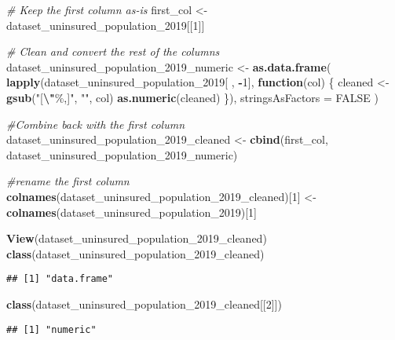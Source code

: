 \documentclass[
]{article}
\newenvironment{Shaded}{\begin{snugshade}}{\end{snugshade}}
\newcommand{\AttributeTok}[1]{\textcolor[rgb]{0.13,0.29,0.53}{#1}}
\newcommand{\CommentTok}[1]{\textcolor[rgb]{0.56,0.35,0.01}{\textit{#1}}}
\newcommand{\ConstantTok}[1]{\textcolor[rgb]{0.56,0.35,0.01}{#1}}
\newcommand{\ControlFlowTok}[1]{\textcolor[rgb]{0.13,0.29,0.53}{\textbf{#1}}}
\newcommand{\DecValTok}[1]{\textcolor[rgb]{0.00,0.00,0.81}{#1}}
\newcommand{\FunctionTok}[1]{\textcolor[rgb]{0.13,0.29,0.53}{\textbf{#1}}}
\newcommand{\NormalTok}[1]{#1}
\newcommand{\OtherTok}[1]{\textcolor[rgb]{0.56,0.35,0.01}{#1}}
\newcommand{\SpecialCharTok}[1]{\textcolor[rgb]{0.81,0.36,0.00}{\textbf{#1}}}
\newcommand{\StringTok}[1]{\textcolor[rgb]{0.31,0.60,0.02}{#1}}
\begin{document}
\begin{Shaded}
\begin{Highlighting}[]
\CommentTok{\# Keep the first column as{-}is}
\NormalTok{first\_col }\OtherTok{\textless{}{-}}\NormalTok{ dataset\_uninsured\_population\_2019[[}\DecValTok{1}\NormalTok{]]}

\CommentTok{\# Clean and convert the rest of the columns}
\NormalTok{dataset\_uninsured\_population\_2019\_numeric }\OtherTok{\textless{}{-}} \FunctionTok{as.data.frame}\NormalTok{(}
  \FunctionTok{lapply}\NormalTok{(dataset\_uninsured\_population\_2019[ , }\SpecialCharTok{{-}}\DecValTok{1}\NormalTok{], }\ControlFlowTok{function}\NormalTok{(col) \{}
\NormalTok{    cleaned }\OtherTok{\textless{}{-}} \FunctionTok{gsub}\NormalTok{(}\StringTok{"[}\SpecialCharTok{\textbackslash{}"}\StringTok{\%,]"}\NormalTok{, }\StringTok{""}\NormalTok{, col)}
    \FunctionTok{as.numeric}\NormalTok{(cleaned)}
\NormalTok{  \}),}
  \AttributeTok{stringsAsFactors =} \ConstantTok{FALSE}
\NormalTok{)}

\CommentTok{\#Combine back with the first column}
\NormalTok{dataset\_uninsured\_population\_2019\_cleaned }\OtherTok{\textless{}{-}} \FunctionTok{cbind}\NormalTok{(first\_col, dataset\_uninsured\_population\_2019\_numeric)}

\CommentTok{\#rename the first column}
\FunctionTok{colnames}\NormalTok{(dataset\_uninsured\_population\_2019\_cleaned)[}\DecValTok{1}\NormalTok{] }\OtherTok{\textless{}{-}} \FunctionTok{colnames}\NormalTok{(dataset\_uninsured\_population\_2019)[}\DecValTok{1}\NormalTok{]}

\FunctionTok{View}\NormalTok{(dataset\_uninsured\_population\_2019\_cleaned)}
\FunctionTok{class}\NormalTok{(dataset\_uninsured\_population\_2019\_cleaned)}
\end{Highlighting}
\end{Shaded}

\begin{verbatim}
## [1] "data.frame"
\end{verbatim}

\begin{Shaded}
\begin{Highlighting}[]
\FunctionTok{class}\NormalTok{(dataset\_uninsured\_population\_2019\_cleaned[[}\DecValTok{2}\NormalTok{]])}
\end{Highlighting}
\end{Shaded}

\begin{verbatim}
## [1] "numeric"
\end{verbatim}
\end{document}
